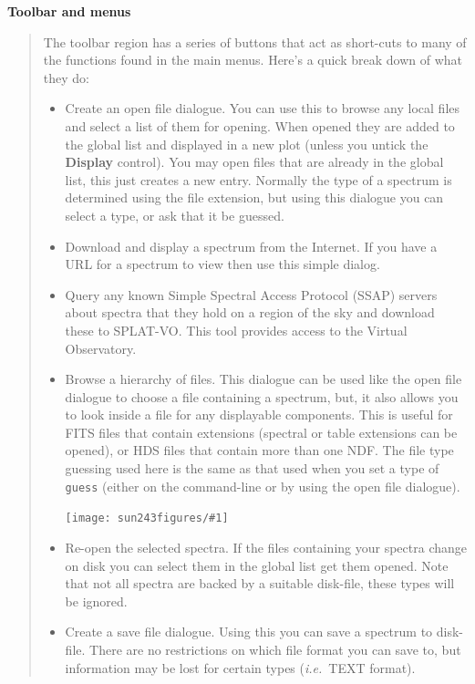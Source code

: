 \documentclass[twoside,11pt]{article}
\newcommand{\htmladdimg}[1]{}
\newcommand{\latexhtml}[2]{#1}
\renewcommand{\_}{\texttt{\symbol{95}}}
\newcommand{\SPLAT}{\textsf{SPLAT-VO}}
\newcommand{\clippedmainfigure}[1]
{\begin{center}
 \latexhtml{\texttt{[image: sun243\_figures/\#1]}}{\htmladdimg{#1.gif}}
 \end{center}
}
\newcommand{\inline}[1]
        {\latexhtml{\texttt{[image: sun243\_figures/\#1]}}
        {\htmladdimg[align=center]{#1.gif}}}
\newcommand{\labelitem}[1]{\textbf{#1}}
\newcommand{\hitext}[1]{\texttt{#1}}
\newcommand{\ie}{\textit{i.e.}}
\newcommand{\subheading}[1]{\textbf{\large{#1}}}
\begin{document}
\subheading{Toolbar and menus}
\begin{quote}
 The toolbar region has a series of buttons that act as short-cuts to
 many of the functions found in the main menus. Here's a quick break
 down of what they do:
 \begin{itemize}

  \item[\inline{openfile}] Create an open file dialogue. You can use this
  to browse any local files and select a list of them for opening. When
  opened they are added to the global list and displayed in a new plot
  (unless you untick the \labelitem{Display} control). You may open files
  that are already in the global list, this just creates a new entry.
  Normally the type of a spectrum is determined using the file extension,
  but using this dialogue you can select a type, or ask that it be guessed.

  \item[\inline{location}] Download and display a spectrum from the Internet.
  If you have a URL for a spectrum to view then use this simple dialog.

  \item[\inline{ssap}] Query any known Simple Spectral Access Protocol (SSAP)
  servers about spectra that they hold on a region of the sky and download
  these to \SPLAT. This tool provides access to the Virtual Observatory.

  \item[\inline{browse}] Browse a hierarchy of files. This dialogue can be used
  like the open file dialogue to choose a file containing a spectrum, but,
  it also allows you to look inside a file for any displayable components.
  This is useful for FITS files that contain extensions (spectral or table
  extensions can be opened), or HDS files that contain more than one NDF.
  The file type guessing used here is the same as that used when you set
  a type of \hitext{guess} (either on the command-line or by using the
  open file dialogue).

  \clippedmainfigure{treeview}

  \item[\inline{reopen}] Re-open the selected spectra. If the files containing
  your spectra change on disk you can select them in the global list get them
  opened. Note that not all spectra are backed by a suitable disk-file, these
  types will be ignored.

  \item[\inline{savefile}] Create a save file dialogue. Using this you can
  save a spectrum to disk-file. There are no restrictions on which file
  format you can save to, but information may be lost for certain types
  (\ie\ TEXT format).


\end{itemize}
\end{quote}
\end{document}

